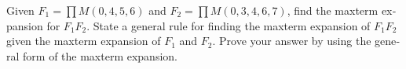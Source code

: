 \begin{latin}
	Given \( F_1 = \prod M(0, 4, 5, 6) \) and \( F_2 = \prod M(0, 3, 4, 6, 7) \), find the maxterm expansion for \( F_1 F_2 \). State a general rule for finding the maxterm expansion of \( F_1 F_2 \) given the maxterm expansion of \( F_1 \) and \( F_2 \). Prove your answer by using the general form of the maxterm expansion.
\end{latin}